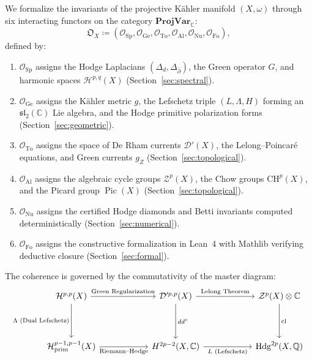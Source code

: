 \documentclass[11pt,a4paper]{article}
\theoremstyle{definition}
\theoremstyle{plain}
\DeclareMathOperator{\Hdg}{Hdg}
\DeclareMathOperator{\cl}{cl}
\DeclareMathOperator{\Pic}{Pic}
\begin{document}
We formalize the invariants of the projective Kähler manifold $(X, \omega)$ through six interacting functors on the category $\mathbf{ProjVar}_{\mathbb{C}}$:
\begin{equation}
    \label{eq:functor_system}
    \mathfrak{O}_X \coloneqq \left( \mathcal{O}_{\mathrm{Sp}}, \mathcal{O}_{\mathrm{Ge}}, \mathcal{O}_{\mathrm{To}}, \mathcal{O}_{\mathrm{Al}}, \mathcal{O}_{\mathrm{Nu}}, \mathcal{O}_{\mathrm{Fo}} \right),
\end{equation}
defined by:
\begin{enumerate}[label=(\roman*)]
    \item $\mathcal{O}_{\mathrm{Sp}}$ assigns the Hodge Laplacians $(\Delta_d, \Delta_{\bar{\partial}})$, the Green operator $G$, and harmonic spaces $\mathcal{H}^{p,q}(X)$ (Section~\ref{sec:spectral}).
    \item $\mathcal{O}_{\mathrm{Ge}}$ assigns the Kähler metric $g$, the Lefschetz triple $(L, \Lambda, H)$ forming an $\mathfrak{sl}_2(\mathbb{C})$ Lie algebra, and the Hodge primitive polarization forms (Section~\ref{sec:geometric}).
    \item $\mathcal{O}_{\mathrm{To}}$ assigns the space of De Rham currents $\mathcal{D}'(X)$, the Lelong--Poincaré equations, and Green currents $g_Z$ (Section~\ref{sec:topological}).
    \item $\mathcal{O}_{\mathrm{Al}}$ assigns the algebraic cycle groups $\mathcal{Z}^p(X)$, the Chow groups $\mathrm{CH}^p(X)$, and the Picard group $\Pic(X)$ (Section~\ref{sec:topological}).
    \item $\mathcal{O}_{\mathrm{Nu}}$ assigns the certified Hodge diamonds and Betti invariants computed deterministically (Section~\ref{sec:numerical}).
    \item $\mathcal{O}_{\mathrm{Fo}}$ assigns the constructive formalization in Lean~4 with Mathlib verifying deductive closure (Section~\ref{sec:formal}).
\end{enumerate}

The coherence is governed by the commutativity of the master diagram:
\begin{equation}
\label{eq:master_hodge_diagram}
\begin{tikzcd}[column sep=2.0cm, row sep=1.4cm]
\mathcal{H}^{p,p}(X) \arrow[r, "\text{Green Regularization}"] \arrow[d, "\Lambda \text{ (Dual Lefschetz)}"'] & \mathcal{D}'^{p,p}(X) \arrow[r, "\text{Lelong Theorem}"] \arrow[d, "dd^c"] & \mathcal{Z}^p(X) \otimes \mathbb{C} \arrow[d, "\cl"] \\
\mathcal{H}^{p-1,p-1}_{\mathrm{prim}}(X) \arrow[r, "\text{Riemann--Hodge}"'] & H^{2p-2}(X, \mathbb{C}) \arrow[r, "L \text{ (Lefschetz)}"'] & \Hdg^{2p}(X, \mathbb{Q})
\end{tikzcd}
\end{equation}
\end{document}
